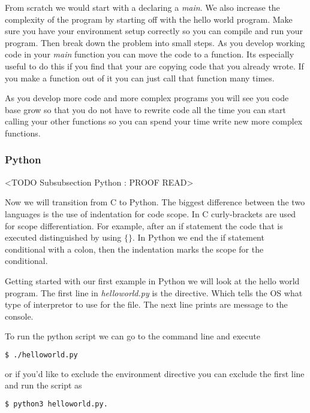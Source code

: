 From scratch we would start with a declaring a \emph{main}. We also increase the complexity of the program by starting off with the hello world program. Make sure you have your environment setup correctly so you can compile and run your program. Then break down the problem into small steps. As you develop working code in your \emph{main} function you can move the code to a function. Its especially useful to do this if you find that your are copying code that you already wrote. If you make a function out of it you can just call that function many times. 

As you develop more code and more complex programs you will see you code base grow so that you do not have to rewrite code all the time you can start calling your other functions so you can spend your time write new more complex functions. 

\subsubsection{Python}
	<TODO Subsubsection  Python : PROOF READ>

Now we will transition from C to Python. The biggest difference between the two languages is the use of indentation for code scope. In C curly-brackets are used for scope differentiation. For example, after an if statement the code that is executed distinguished by using $\{\}$. In Python we end the if statement conditional with a colon, then the indentation marks the scope for the conditional. 

Getting started with our first example in Python we will look at the hello world program. The first line in \emph{helloworld.py} is the directive. Which tells the \ac{OS} what type of interpretor to use for the file. The next line prints are message to the console. 



To run the python script we can go to the command line and execute

\begin{lstlisting}[language=bash]
    $ ./helloworld.py
\end{lstlisting}

or if you'd like to exclude the environment directive you can exclude the first line and run the script as

\begin{lstlisting}[language=bash]
    $ python3 helloworld.py.
\end{lstlisting}

